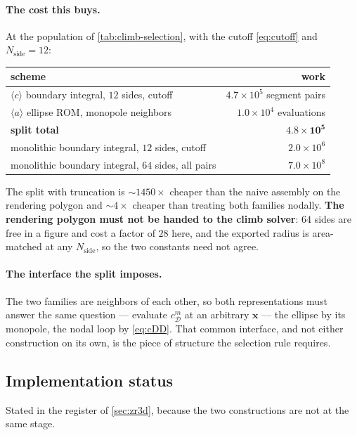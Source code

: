 \documentclass{article}
\newcommand{\aloop}{\ensuremath{\langle a\rangle}}
\newcommand{\cloop}{\ensuremath{\langle c\rangle}}
\begin{document}
\paragraph{The cost this buys.} At the population of \cref{tab:climb-selection},
with the cutoff \cref{eq:cutoff} and $N_{\mathrm{side}}=12$:
\begin{center}\small
\begin{tabular}{@{}lr@{}}
\toprule
scheme & work\\
\midrule
\cloop{} boundary integral, $12$ sides, cutoff & $4.7\times10^{5}$ segment pairs\\
\aloop{} ellipse ROM, monopole neighbors & $1.0\times10^{4}$ evaluations\\
\textbf{split total} & $\mathbf{4.8\times10^{5}}$\\
monolithic boundary integral, $12$ sides, cutoff & $2.0\times10^{6}$\\
monolithic boundary integral, $64$ sides, all pairs & $7.0\times10^{8}$\\
\bottomrule
\end{tabular}
\end{center}
The split with truncation is $\sim\!1450\times$ cheaper than the naive assembly on
the rendering polygon and $\sim\!4\times$ cheaper than treating both families
nodally. \textbf{The rendering polygon must not be handed to the climb solver}:
$64$ sides are free in a figure and cost a factor of $28$ here, and the exported
radius is area-matched at any $N_{\mathrm{side}}$, so the two constants need not
agree.

\paragraph{The interface the split imposes.} The two families are neighbors of
each other, so both representations must answer the same question --- evaluate
$c^m_{\mathcal D}$ at an arbitrary $\bm x$ --- the ellipse by its monopole, the
nodal loop by \cref{eq:cDD}. That common interface, and not either construction on
its own, is the piece of structure the selection rule requires.

\subsection{Implementation status}
\label{sec:climb-status}

Stated in the register of \cref{sec:zr3d}, because the two constructions are not
at the same stage.
\end{document}
